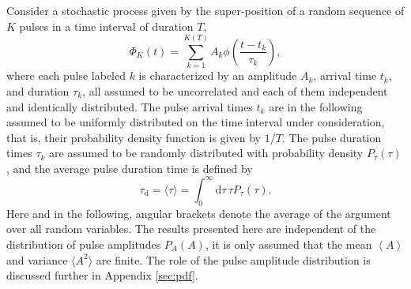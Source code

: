 \documentclass[aps,prb,12pt,a4paper,preprint,amsmath,amssymb,groupedaddress]{revtex4-1}
\newcommand{\ave}[1]{{\left<#1\right>}}
\newcommand{\rmd}{\text{d}}
\newcommand{\taud}{\ensuremath{\tau_\text{d}}}
\newcommand{\Aave}{\ensuremath{\ave{A}}}
\begin{document}
Consider a stochastic process given by the super-position of a random sequence of $K$ pulses in a time interval of duration $T$,\cite{garcia-prl,kube-php,theodorsen-php,garcia-php,theodorsen-ps,garcia-phpl,rice,parzen,pecseli,lowen}
\begin{equation}\label{shotnoise}
\Phi_K(t) = \sum_{k=1}^{K(T)} A_k\phi\left( \frac{t-t_k}{\tau_k} \right) ,
\end{equation}
where each pulse labeled $k$ is characterized by an amplitude $A_k$, arrival time $t_k$, and duration $\tau_k$, all assumed to be uncorrelated and each of them independent and identically distributed. The pulse arrival times $t_k$ are in the following assumed to be uniformly distributed on the time interval under consideration, that is, their probability density function is given by $1/T$. The pulse duration times $\tau_k$ are assumed to be randomly distributed with probability density $P_\tau(\tau)$, and the average pulse duration time is defined by
\begin{equation}\label{Ptaud}
\taud = \langle \tau \rangle = \int_0^\infty \rmd\tau\,\tau P_\tau(\tau) .
\end{equation}
Here and in the following, angular brackets denote the average of the argument over all random variables. The results presented here are independent of the distribution of pulse amplitudes $P_A(A)$, it is only assumed that the mean $\Aave$ and variance $\langle{A^2}\rangle$ are finite. The role of the pulse amplitude distribution is discussed further in Appendix \ref{sec:pdf}.
\end{document}
